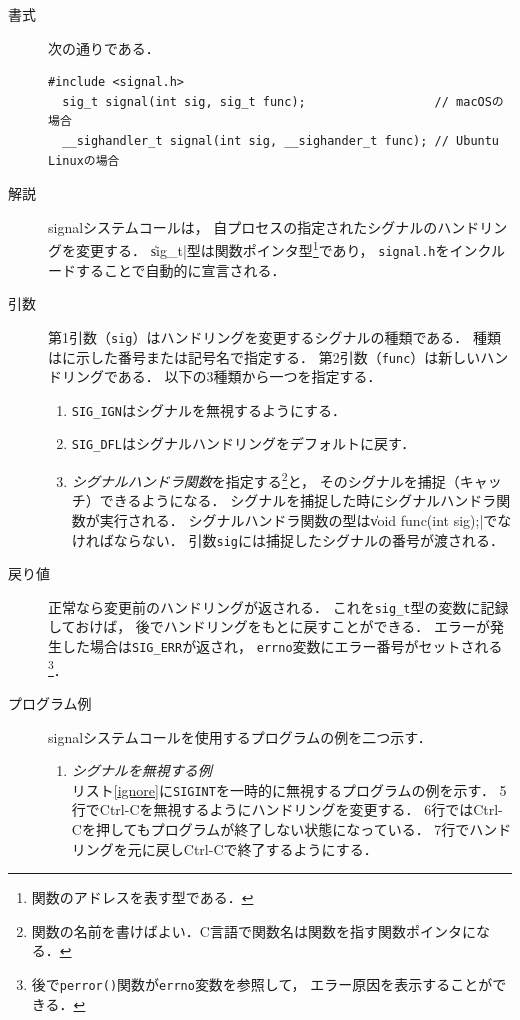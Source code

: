 \begin{description}
\item[書式] 次の通りである．
\begin{lstlisting}[numbers=none]
  #include <signal.h>
  sig_t signal(int sig, sig_t func);                  // macOSの場合
  __sighandler_t signal(int sig, __sighander_t func); // Ubuntu Linuxの場合
\end{lstlisting}

\item[解説]
  signalシステムコールは，
  自プロセスの指定されたシグナルのハンドリングを変更する．
  \|sig_t|型は関数ポインタ型\footnote{
    関数のアドレスを表す型である．
  }であり，
  \texttt{signal.h}をインクルードすることで自動的に宣言される．

\item[引数]
  第1引数（\texttt{sig}）はハンドリングを変更するシグナルの種類である．
  種類はに示した番号または記号名で指定する．
  第2引数（\texttt{func}）は新しいハンドリングである．
  以下の3種類から一つを指定する．

  \begin{enumerate}
  \item \texttt{SIG\_IGN}はシグナルを無視するようにする．
  \item \texttt{SIG\_DFL}はシグナルハンドリングをデフォルトに戻す．
  \item \emph{シグナルハンドラ関数}を指定する\footnote{
    関数の名前を書けばよい．C言語で関数名は関数を指す関数ポインタになる．}と，
    そのシグナルを捕捉（キャッチ）できるようになる．
    シグナルを捕捉した時にシグナルハンドラ関数が実行される．
    シグナルハンドラ関数の型は\|void func(int sig);|でなければならない．
    引数\texttt{sig}には捕捉したシグナルの番号が渡される．
  \end{enumerate}

\item[戻り値]
  正常なら変更前のハンドリングが返される．
  これを\texttt{sig\_t}型の変数に記録しておけば，
  後でハンドリングをもとに戻すことができる．
  エラーが発生した場合は\texttt{SIG\_ERR}が返され，
  \texttt{errno}変数にエラー番号がセットされる\footnote{
    後で\texttt{perror()}関数が\texttt{errno}変数を参照して，
    エラー原因を表示することができる．}．

\item[プログラム例] signalシステムコールを使用するプログラムの例を二つ示す．
  \begin{enumerate}
  \item \emph{シグナルを無視する例} \\
    リスト\ref{ignore}に\texttt{SIGINT}を一時的に無視するプログラムの例を示す．
    5行でCtrl-Cを無視するようにハンドリングを変更する．
    6行ではCtrl-Cを押してもプログラムが終了しない状態になっている．
    7行でハンドリングを元に戻しCtrl-Cで終了するようにする．


\end{enumerate}
\end{description}
